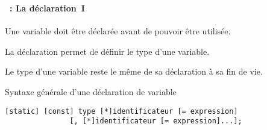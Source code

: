 \begin{frame}[containsverbatim]
  \frametitle{\secname}
  \framesubtitle{\subsecname~: La déclaration~I}

  Une variable doit être déclarée avant de pouvoir être utilisée. 
  \vspace{0.5cm}
  \par
  La déclaration permet de définir le type d'une variable.
  \vspace{0.5cm}
  \par
  Le type d'une variable reste le même de sa déclaration à sa fin de vie.
  \vspace{0.5cm}
  \par
  \begin{block}{Syntaxe générale d'une déclaration de variable}
    {\small\begin{verbatim}
[static] [const] type [*]identificateur [= expression] 
               [, [*]identificateur [= expression]...];
    \end{verbatim}}
  \end{block}
\end{frame}

